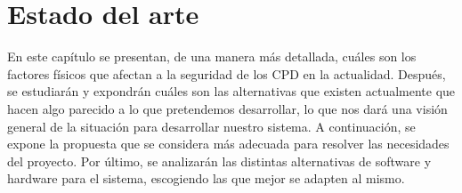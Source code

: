 \chapter{Estado del arte}
\label{ch:estado}
En este capítulo se presentan, de una manera más detallada, cuáles son los factores físicos que afectan a la seguridad de los CPD en la actualidad. Después, se estudiarán y expondrán cuáles son las alternativas que existen actualmente que hacen algo parecido a lo que pretendemos desarrollar, lo que nos dará una visión general de la situación para desarrollar nuestro sistema. A continuación, se expone la propuesta que se considera más adecuada para resolver las necesidades del proyecto. Por último, se analizarán las distintas alternativas de software y hardware para el sistema, escogiendo las que mejor se adapten al mismo.

